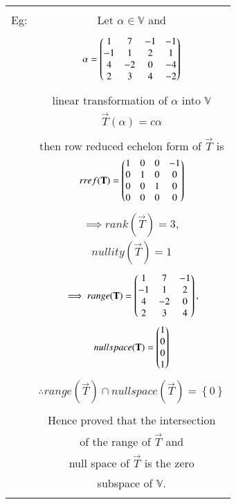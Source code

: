 \documentclass[journal,12pt,twocolumn]{IEEEtran}
\begin{document}
\begin{table}[h!]
\begin{center}
\begin{tabular}{|c|c|}
\hline
& \\
Eg: & Let $\alpha \in \mathbb{V}$ and\\
& \\
& $\alpha = \begin{pmatrix}1&7&-1&-1\\-1&1&2&1\\4&-2&0&-4\\2&3&4&-2\end{pmatrix}$\\
& \\
& linear transformation of $\alpha$ into $\mathbb{V}$\\
& $\vec{T}(\alpha) = c\alpha$\\
& \\
& then row reduced echelon form of $\vec{T}$ is\\
& $rref(\mathbf{T}) = \begin{pmatrix}1&0&0&-1\\0&1&0&0\\0&0&1&0\\0&0&0&0\end{pmatrix}$\\
& \\
& $\implies rank(\vec{T}) = 3,$\\
& $nullity(\vec{T}) = 1$\\
& \\
& $\implies range(\mathbf{T}) = \begin{pmatrix}1&7&-1\\-1&1&2\\4&-2&0\\2&3&4\end{pmatrix},$\\
& $null space(\mathbf{T}) = \begin{pmatrix}1\\0\\0\\1\end{pmatrix}$\\
& \\
& $\therefore range(\vec{T}) \cap null space(\vec{T}) = \left\lbrace 0 \right\rbrace$\\
& \\
& Hence proved that the intersection \\
& of the range of $\vec{T}$ and \\
& null space of $\vec{T}$ is the zero \\
& subspace of $\mathbb{V}$.\\
& \\
\hline
\end{tabular}
\end{center}
\end{table}
\end{document}
